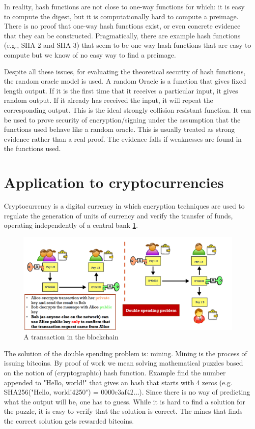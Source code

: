 In reality, hash functions are not close to one-way functions for which: it is easy to compute the digest, but it is computationally hard to compute a preimage.
There is no proof that one-way hash functions exist, or even concrete evidence that they can be constructed. Pragmatically, there are example hash functions (e.g., SHA-2 and SHA-3) that seem to be one-way hash functions that are easy to compute but we know of no easy way to find a preimage. 

Despite all these issues, for evaluating the theoretical security of hash functions, the random oracle model is used. A random Oracle is a function that gives fixed length output.  If it is the first time that it receives a particular input, it gives random output. If it already has received the input, it will repeat the corresponding output. This is the ideal strongly collision resistant function.  It can be used to prove security of encryption/signing under the assumption that the functions used behave like a random oracle. This is usually treated as strong evidence rather than a real proof. The evidence falls if weaknesses are found in the functions used.

\section{Application to cryptocurrencies}
Cryptocurrency is a digital currency in which encryption techniques are used to regulate the generation of units of currency and verify the transfer of funds, operating independently of a central bank \ref{fig:crypto}.

\begin{figure}
	\centering
	\includegraphics[width=0.7\linewidth]{Images/Chapter6/crypto}
	\caption{A transaction in the blockchain}
	\label{fig:crypto}
\end{figure}

The solution of the double spending problem is: mining. Mining is the process of issuing bitcoins. By proof of work we mean solving mathematical puzzles based on the notion of (cryptographic) hash function. Example find the number appended to "Hello, world!" that gives an hash that starts with 4 zeros (e.g. SHA256("Hello, world!4250") = 0000c3af42...). Since there is no way of predicting what the output will be, one has to guess. While it is hard to find a solution for the puzzle, it is easy to verify that the solution is correct. The mines that finds the correct solution gets rewarded bitcoins.

